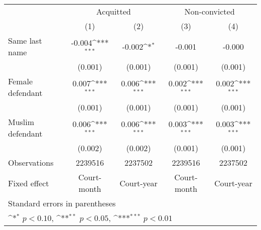 {
\def\sym#1{\ifmmode^{#1}\else\(^{#1}\)\fi}
\begin{tabular}{l*{4}{c}}
\hline\hline
                    &\multicolumn{2}{c}{Acquitted}              &\multicolumn{2}{c}{Non-convicted}          \\\cmidrule(lr){2-3}\cmidrule(lr){4-5}
                    &\multicolumn{1}{c}{(1)}&\multicolumn{1}{c}{(2)}&\multicolumn{1}{c}{(3)}&\multicolumn{1}{c}{(4)}\\
                    \hline
Same last name      &      -0.004\sym{***}&      -0.002\sym{*}  &      -0.001         &      -0.000         \\
                    &     (0.001)         &     (0.001)         &     (0.001)         &     (0.001)         \\
Female defendant    &       0.007\sym{***}&       0.006\sym{***}&       0.002\sym{***}&       0.002\sym{***}\\
                    &     (0.001)         &     (0.001)         &     (0.001)         &     (0.001)         \\
Muslim defendant    &       0.006\sym{***}&       0.006\sym{***}&       0.003\sym{***}&       0.003\sym{***}\\
                    &     (0.002)         &     (0.002)         &     (0.001)         &     (0.001)         \\
\hline
Observations        &     2239516         &     2237502         &     2239516         &     2237502         \\
Fixed effect        & Court-month         &  Court-year         & Court-month         &  Court-year         \\
\hline\hline
\multicolumn{5}{l}{\footnotesize Standard errors in parentheses}\\
\multicolumn{5}{l}{\footnotesize \sym{*} \(p<0.10\), \sym{**} \(p<0.05\), \sym{***} \(p<0.01\)}\\
\end{tabular}
}
